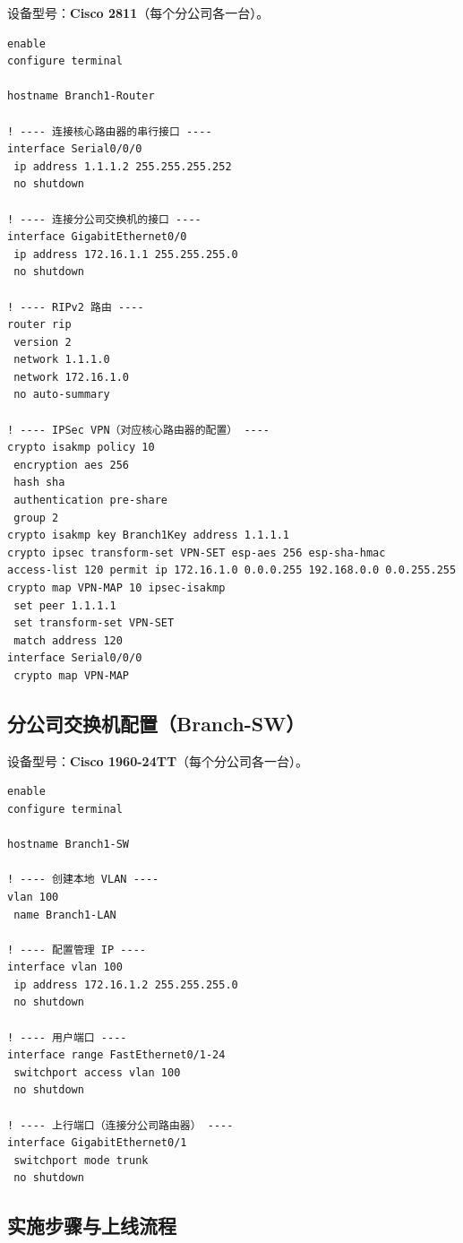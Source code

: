 \documentclass[12pt,a4paper]{ctexart}
\begin{document}
设备型号：\textbf{Cisco 2811}（每个分公司各一台）。

\begin{lstlisting}[caption={分公司路由器配置（以Branch1为例）}, label={lst:branch}]
enable
configure terminal

hostname Branch1-Router

! ---- 连接核心路由器的串行接口 ----
interface Serial0/0/0
 ip address 1.1.1.2 255.255.255.252
 no shutdown

! ---- 连接分公司交换机的接口 ----
interface GigabitEthernet0/0
 ip address 172.16.1.1 255.255.255.0
 no shutdown

! ---- RIPv2 路由 ----
router rip
 version 2
 network 1.1.1.0
 network 172.16.1.0
 no auto-summary

! ---- IPSec VPN（对应核心路由器的配置） ----
crypto isakmp policy 10
 encryption aes 256
 hash sha
 authentication pre-share
 group 2
crypto isakmp key Branch1Key address 1.1.1.1
crypto ipsec transform-set VPN-SET esp-aes 256 esp-sha-hmac
access-list 120 permit ip 172.16.1.0 0.0.0.255 192.168.0.0 0.0.255.255
crypto map VPN-MAP 10 ipsec-isakmp
 set peer 1.1.1.1
 set transform-set VPN-SET
 match address 120
interface Serial0/0/0
 crypto map VPN-MAP
\end{lstlisting}

\subsection{分公司交换机配置（Branch-SW）}

设备型号：\textbf{Cisco 1960-24TT}（每个分公司各一台）。

\begin{lstlisting}[caption={分公司交换机基础配置}, label={lst:branch-sw}]
enable
configure terminal

hostname Branch1-SW

! ---- 创建本地 VLAN ----
vlan 100
 name Branch1-LAN

! ---- 配置管理 IP ----
interface vlan 100
 ip address 172.16.1.2 255.255.255.0
 no shutdown

! ---- 用户端口 ----
interface range FastEthernet0/1-24
 switchport access vlan 100
 no shutdown

! ---- 上行端口（连接分公司路由器） ----
interface GigabitEthernet0/1
 switchport mode trunk
 no shutdown
\end{lstlisting}

\subsection{实施步骤与上线流程}
\end{document}

